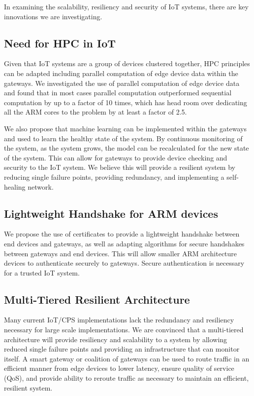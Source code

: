 \documentclass[../main.tex]{subfiles}
\begin{document}

In examining the scalability, resiliency and security of IoT systems, there are key innovations we are investigating. 

\subsection{Need for HPC in IoT}
Given that IoT systems are a group of devices clustered together, HPC principles can be adapted including parallel computation of edge device data within the gateways. We investigated the use of parallel computation of edge device data and found that in most cases parallel computation outperformed sequential computation by up to a factor of 10 times, which has head room over dedicating all the ARM cores to the problem by at least a factor of 2.5.

We also propose that machine learning can be implemented within the gateways and used to learn the healthy state of the system. By continuous monitoring of the system, as the system grows, the model can be recalculated for the new state of the system. This can allow for gateways to provide device checking and security to the IoT system. We believe this will provide a resilient system by reducing single failure points, providing redundancy, and implementing a self-healing network. 

\subsection{Lightweight Handshake for ARM devices}

We propose the use of certificates to provide a lightweight handshake between end devices and gateways, as well as adapting algorithms for secure handshakes between gateways and end devices. This will allow smaller ARM architecture devices to authenticate securely to gateways. Secure authentication is necessary for a trusted IoT system.  


\subsection{Multi-Tiered Resilient Architecture}

Many current IoT/CPS implementations lack the redundancy and resiliency necessary for large scale implementations. We are convinced that a multi-tiered architecture will provide resiliency and scalability to a system by allowing reduced single failure points and providing an infrastructure that can monitor itself. A smart gateway or coalition of gateways can be used to route traffic in an efficient manner from edge devices to lower latency, ensure quality of service (QoS), and provide ability to reroute traffic as necessary to maintain an efficient, resilient system. 
\end{document}
